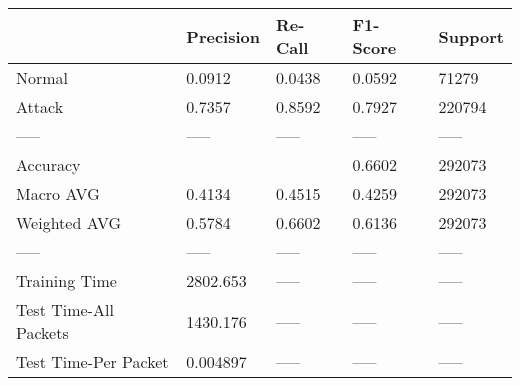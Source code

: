 \begin{tabular}{lllll}
\toprule
{} & Precision & Re-Call & F1-Score & Support \\
\midrule
Normal                &    0.0912 &  0.0438 &   0.0592 &   71279 \\
Attack                &    0.7357 &  0.8592 &   0.7927 &  220794 \\
-----                 &     ----- &   ----- &    ----- &   ----- \\
Accuracy              &           &         &   0.6602 &  292073 \\
Macro AVG             &    0.4134 &  0.4515 &   0.4259 &  292073 \\
Weighted AVG          &    0.5784 &  0.6602 &   0.6136 &  292073 \\
-----                 &     ----- &   ----- &    ----- &   ----- \\
Training Time         &  2802.653 &   ----- &    ----- &   ----- \\
Test Time-All Packets &  1430.176 &   ----- &    ----- &   ----- \\
Test Time-Per Packet  &  0.004897 &   ----- &    ----- &   ----- \\
\bottomrule
\end{tabular}
